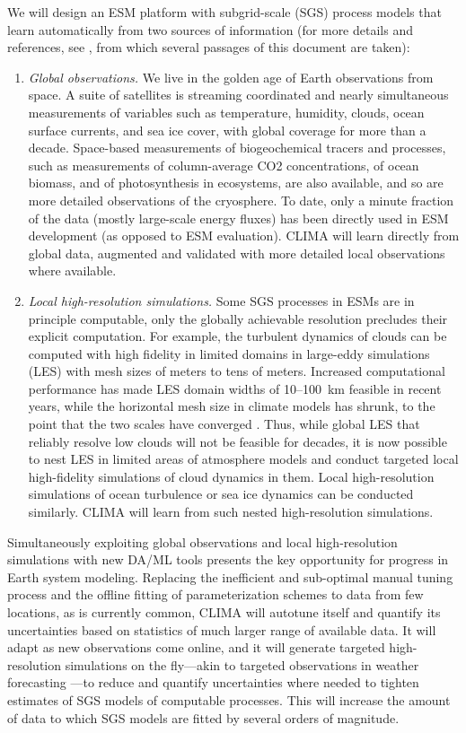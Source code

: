 \documentclass{article}
\begin{document}
We will design an ESM platform with subgrid-scale (SGS) process models that learn automatically from two sources of information (for more details and references, see \citet{Schneider17c}, from which several passages of this document are taken):
\begin{enumerate}
    \item \emph{Global observations.} We live in the golden age of Earth observations from space. A suite of satellites is streaming coordinated and nearly simultaneous measurements of variables such as temperature, humidity, clouds, ocean surface currents, and sea ice cover, with global coverage for more than a decade. Space-based measurements of biogeochemical tracers and processes, such as measurements of column-average CO2 concentrations, of ocean biomass, and of photosynthesis in ecosystems, are also available, and so are more detailed observations of the cryosphere. To date, only a minute fraction of the data (mostly large-scale energy fluxes) has been directly used in ESM development (as opposed to ESM evaluation). CLIMA will learn directly from global data, augmented and validated with more detailed local observations where available.
    \item \emph{Local high-resolution simulations.} Some SGS processes in ESMs are in principle computable, only the globally achievable resolution precludes their explicit computation. For example, the turbulent dynamics of clouds can be computed with high fidelity in limited domains in large-eddy simulations (LES) with mesh sizes of meters to tens of meters. Increased computational performance has made LES domain widths of 10--100~km feasible in recent years, while the horizontal mesh size in climate models has shrunk, to the point that the two scales have converged \citep{Schneider17a}. Thus, while global LES that reliably resolve low clouds will not be feasible for decades, it is now possible to nest LES in limited areas of atmosphere models and conduct targeted local high-fidelity simulations of cloud dynamics in them. Local high-resolution simulations of ocean turbulence or sea ice dynamics can be conducted similarly. CLIMA will learn from such nested high-resolution simulations.
\end{enumerate}
Simultaneously exploiting global observations and local high-resolution simulations with new DA/ML tools presents the key opportunity for  progress in Earth system modeling. Replacing the inefficient and sub-optimal manual tuning process and the offline fitting of parameterization schemes to data from few locations, as is currently common, CLIMA will autotune itself and quantify its uncertainties based on statistics of much larger range of available data. It will adapt as new observations come online, and it will generate targeted high-resolution simulations on the fly---akin to targeted observations in weather forecasting \citep{Palmer98a,Lorenz98a}---to reduce and quantify uncertainties where needed to tighten estimates of SGS models of computable processes. This will increase the amount of data to which SGS models are fitted by several orders of magnitude.
\end{document}
